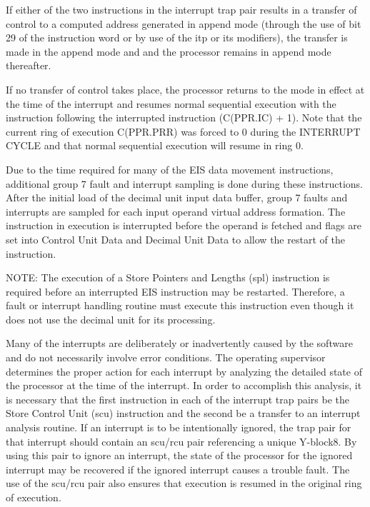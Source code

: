 If either of the two instructions in the interrupt trap pair results in a
transfer of control to a computed address generated in append mode (through the
use of bit 29 of the instruction word or by use of the itp or its modifiers),
the transfer is made in the append mode and and the processor remains in append
mode thereafter.

If no transfer of control takes place, the processor returns to the mode in
effect at the time of the interrupt and resumes normal sequential execution
with the instruction following the interrupted instruction (C(PPR.IC) + 1).
Note that the current ring of execution C(PPR.PRR) was forced to 0 during the
INTERRUPT CYCLE and that normal sequential execution will resume in ring 0.

Due to the time required for many of the EIS data movement instructions,
additional group 7 fault and interrupt sampling is done during these
instructions. After the initial load of the decimal unit input data buffer,
group 7 faults and interrupts are sampled for each input operand virtual
address formation. The instruction in execution is interrupted before the
operand is fetched and flags are set into Control Unit Data and Decimal Unit
Data to allow the restart of the instruction.


NOTE: The execution of a Store Pointers and Lengths (spl) instruction is
required before an interrupted EIS instruction may be restarted. Therefore, a
fault or interrupt handling routine must execute this instruction even though
it does not use the decimal unit for its processing.


Many of the interrupts are deliberately or inadvertently caused by the software
and do not necessarily involve error conditions. The operating supervisor
determines the proper action for each interrupt by analyzing the detailed state
of the processor at the time of the interrupt. In order to accomplish this
analysis, it is necessary that the first instruction in each of the interrupt
trap pairs be the Store Control Unit (scu) instruction and the second be a
transfer to an interrupt analysis routine. If an interrupt is to be
intentionally ignored, the trap pair for that interrupt should contain an
scu/rcu pair referencing a unique Y-block8. By using this pair to ignore an
interrupt, the state of the processor for the ignored interrupt may be
recovered if the ignored interrupt causes a trouble fault. The use of the
scu/rcu pair also ensures that execution is resumed in the original ring of
execution.





